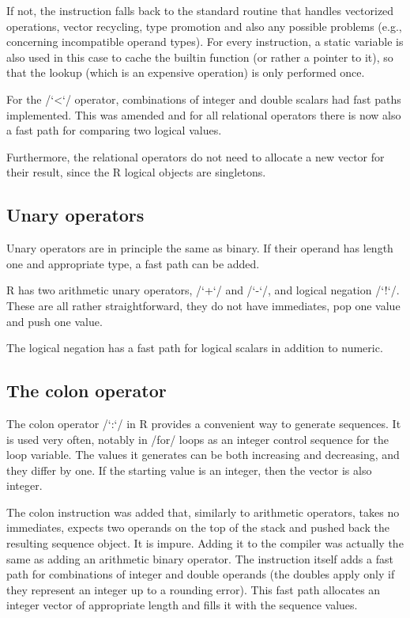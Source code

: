 If not, the instruction falls back to the standard routine that handles vectorized operations, vector recycling, type promotion and also any possible problems (e.g., concerning incompatible operand types). For every instruction, a static variable is also used in this case to cache the builtin function (or rather a pointer to it), so that the lookup (which is an expensive operation) is only performed once.

For the \rinline/`<`/ operator, combinations of integer and double scalars had fast paths implemented. This was amended and for all relational operators there is now also a fast path for comparing two logical values.

Furthermore, the relational operators do not need to allocate a new vector for their result, since the R logical objects are singletons.



\subsection{Unary operators}

Unary operators are in principle the same as binary. If their operand has length one and appropriate type, a fast path can be added.

R has two arithmetic unary operators, \rinline/`+`/ and \rinline/`-`/, and logical negation \rinline/`!`/. These are all rather straightforward, they do not have immediates, pop one value and push one value.

The logical negation has a fast path for logical scalars in addition to numeric.


\subsection{The colon operator}

The colon operator \rinline/`:`/ in R provides a convenient way to generate sequences. It is used very often, notably in \rinline/for/ loops as an integer control sequence for the loop variable. The values it generates can be both increasing and decreasing, and they differ by one. If the starting value is an integer, then the vector is also integer.

The colon instruction was added that, similarly to arithmetic operators, takes no immediates, expects two operands on the top of the stack and pushed back the resulting sequence object. It is impure. Adding it to the compiler was actually the same as adding an arithmetic binary operator. The instruction itself adds a fast path for combinations of integer and double operands (the doubles apply only if they represent an integer up to a rounding error). This fast path allocates an integer vector of appropriate length and fills it with the sequence values.

